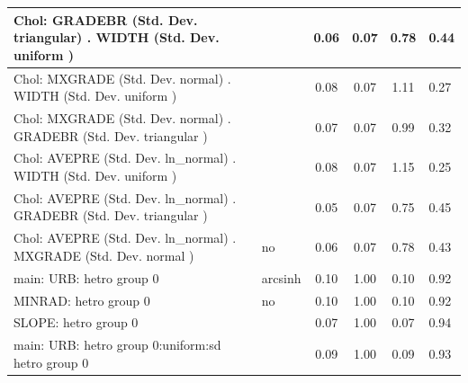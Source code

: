 \begin{table}
\begin{center}
\begin{tabular}{|l|l|c|c|c|l|}
			\hline
			 Chol: GRADEBR (Std. Dev. triangular) . WIDTH (Std. Dev.   uniform ) &  & 0.06 & 0.07 & 0.78 & 0.44 \\
			\hline
			 Chol: MXGRADE (Std. Dev. normal) . WIDTH (Std. Dev.   uniform ) &  & 0.08 & 0.07 & 1.11 & 0.27 \\
			\hline
			 Chol: MXGRADE (Std. Dev. normal) . GRADEBR (Std. Dev.   triangular ) &  & 0.07 & 0.07 & 0.99 & 0.32 \\
			\hline
			 Chol: AVEPRE (Std. Dev. ln_normal) . WIDTH (Std. Dev.   uniform ) &  & 0.08 & 0.07 & 1.15 & 0.25 \\
			\hline
			 Chol: AVEPRE (Std. Dev. ln_normal) . GRADEBR (Std. Dev.   triangular ) &  & 0.05 & 0.07 & 0.75 & 0.45 \\
			\hline
			 Chol: AVEPRE (Std. Dev. ln_normal) . MXGRADE (Std. Dev.   normal ) & no & 0.06 & 0.07 & 0.78 & 0.43 \\
			\hline
			main: URB: hetro group 0 & arcsinh & 0.10 & 1.00 & 0.10 & 0.92 \\
			\hline
			MINRAD: hetro group 0 & no & 0.10 & 1.00 & 0.10 & 0.92 \\
			\hline
			SLOPE: hetro group 0 &  & 0.07 & 1.00 & 0.07 & 0.94 \\
			\hline
			main: URB: hetro group 0:uniform:sd  hetro group 0 &  & 0.09 & 1.00 & 0.09 & 0.93 \\
			\hline
		\end{tabular}
	\end{center}
\end{table}